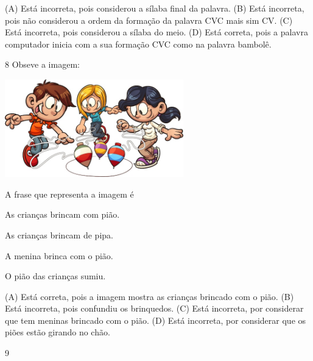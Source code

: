 (A) Está incorreta, pois considerou a sílaba final da palavra.
(B) Está incorreta, pois não considerou a ordem da formação da palavra
CVC mais sim CV.
(C) Está incorreta, pois considerou a sílaba do meio.
(D) Está correta, pois a palavra computador inicia com a sua formação
CVC como na palavra bambolê.

\num{8} Obseve a imagem:

\includegraphics[width=3.05095in,height=1.66841in]{media/image144.jpeg}


A frase que representa a imagem é

\begin{escolha}
\item As crianças brincam com pião.

\item As crianças brincam de pipa.

\item A menina brinca com o pião.

\item O pião das crianças sumiu.
\end{escolha}


(A) Está correta, pois a imagem mostra as crianças brincado com o pião.
(B) Está incorreta, pois confundiu os brinquedos.
(C) Está incorreta, por considerar que tem meninas brincado com o pião.
(D) Está incorreta, por considerar que os piões estão girando no chão.

\num{9}

